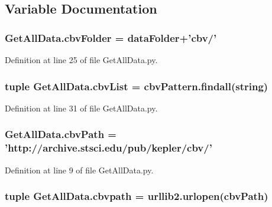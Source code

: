 \subsection{Variable Documentation}
\hypertarget{namespace_get_all_data_a92d210ac17aea3c86c2cae13d5dcf53a}{
\subsubsection[{cbv\-Folder}]{ Get\-All\-Data.\-cbv\-Folder = {\bf data\-Folder}+'cbv/'}}\label{namespace_get_all_data_a92d210ac17aea3c86c2cae13d5dcf53a}


Definition at line 25 of file Get\-All\-Data.\-py.

\hypertarget{namespace_get_all_data_aef4e9610ed4d2405e028274abbfcdb43}{
\subsubsection[{cbv\-List}]{\setlength{\rightskip}{0pt plus 5cm}tuple Get\-All\-Data.\-cbv\-List = cbv\-Pattern.\-findall({\bf string})}}\label{namespace_get_all_data_aef4e9610ed4d2405e028274abbfcdb43}


Definition at line 31 of file Get\-All\-Data.\-py.

\hypertarget{namespace_get_all_data_a0d44f716af41966e5d4c1e8ec5daca53}{
\subsubsection[{cbv\-Path}]{ Get\-All\-Data.\-cbv\-Path = 'http\-://archive.\-stsci.\-edu/pub/kepler/cbv/'}}\label{namespace_get_all_data_a0d44f716af41966e5d4c1e8ec5daca53}


Definition at line 9 of file Get\-All\-Data.\-py.

\hypertarget{namespace_get_all_data_ac340b879890051d52eef59bb312d86c6}{
\subsubsection[{cbvpath}]{\setlength{\rightskip}{0pt plus 5cm}tuple Get\-All\-Data.\-cbvpath = urllib2.\-urlopen({\bf cbv\-Path})}}\label{namespace_get_all_data_ac340b879890051d52eef59bb312d86c6}



